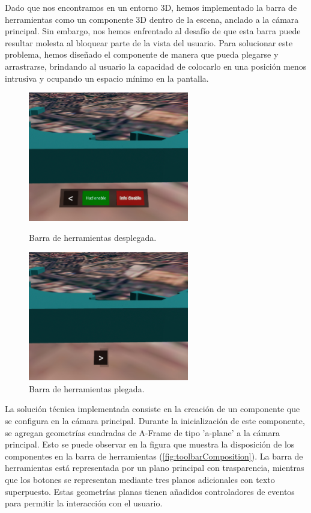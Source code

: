 \documentclass[a4paper, 11pt]{book}
\begin{document}
Dado que nos encontramos en un entorno 3D, hemos implementado la barra de herramientas como un componente 3D dentro de la escena, anclado a la cámara principal. Sin embargo, nos hemos enfrentado al desafío de que esta barra puede resultar molesta al bloquear parte de la vista del usuario. Para solucionar este problema, hemos diseñado el componente de manera que pueda plegarse y arrastrarse, brindando al usuario la capacidad de colocarlo en una posición menos intrusiva y ocupando un espacio mínimo en la pantalla.
\begin{figure}[h]
  \begin{minipage}[t]{0.5\linewidth}
    \centering
    \includegraphics[width=7cm, keepaspectratio]{img/toolbarAbierta.jpg}
    \caption{Barra de herramientas desplegada.}
    \label{fig:toolbarDesplegada}
  \end{minipage}%
  \begin{minipage}[t]{0.5\linewidth}
    \centering
    \includegraphics[width=7cm, keepaspectratio]{img/toolbarPlegada.jpg}
    \caption{Barra de herramientas plegada.}
    \label{fig:toolbarPlegada}    
  \end{minipage}
\end{figure}
La solución técnica implementada consiste en la creación de un componente que se configura en la cámara principal. Durante la inicialización de este componente, se agregan geometrías cuadradas de A-Frame de tipo 'a-plane' a la cámara principal. Esto se puede observar en la figura que muestra la disposición de los componentes en la barra de herramientas (\ref{fig:toolbarComposition}). La barra de herramientas está representada por un plano principal con trasparencia, mientras que los botones se representan mediante tres planos adicionales con texto superpuesto. Estas geometrías planas tienen añadidos controladores de eventos para permitir la interacción con el usuario.
\end{document}

